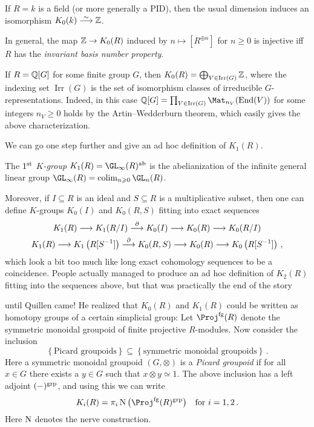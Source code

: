 	\begin{exm}
		\begin{alphanumerate}
			\item If $R=k$ is a field (or more generally a PID), then the usual dimension induces an isomorphism $K_0(k)\isomorphism\IZ$.
			\item In general, the map $\mathbb{Z}\rightarrow K_0(R)$ induced by $n\mapsto [R^{\oplus n}]$ for $n\geq0$ is injective iff $R$ has the \emph{invariant basis number property}.
			\item If $R=\mathbb{Q}[G]$ for some finite group $G$, then $K_0(R)=\bigoplus_{V\in \operatorname{Irr}(G)}\mathbb{Z}$, where the indexing set $\operatorname{Irr}(G)$ is the set of isomorphism classes of irreducible $G$-representations. Indeed, in this case $\IQ[G]=\prod_{V\in\operatorname{Irr}(G)}\Mat_{n_V}(\End(V))$ for some integers $n_V\geq 0$ holds by the Artin--Wedderburn theorem, which easily gives the above characterization.
		\end{alphanumerate}
	\end{exm}
	We can go one step further and give an ad hoc definition of $K_1(R)$.
	\begin{defi}
		The \emph{$1^{\text{st}}$ $K$-group} $K_1(R)=\GL_\infty(R)^\ab$ is the abelianization of the infinite general linear group $\GL_\infty(R)=\colimit_{n\geq 0}\GL_n(R)$.
	\end{defi}
	Moreover, if $I\subseteq R$ is an ideal and $S\subseteq R$ is a multiplicative subset, then one can define $K$-groups $K_0(I)$ and $K_0(R,S)$ fitting into exact sequences
	\begin{gather*}
		K_1(R)\morphism K_1(R/I)\morphism[\partial]K_0(I)\morphism K_0(R)\morphism K_0(R/I)\\
		K_1(R)\morphism K_1\left(R[S^{-1}]\right)\morphism[\partial]K_0(R,S)\morphism K_0(R)\morphism K_0\left(R[S^{-1}]\right)\,,
	\end{gather*}
	which look a bit too much like long exact cohomology sequences to be a coincidence. People actually managed to produce an ad hoc definition of $K_2(R)$ fitting into the sequences above, but that was practically the end of the story \dotso 
	
	\dotso until Quillen came! He realized that $K_0(R)$ and $K_1(R)$ could be written as homotopy groups of a certain simplicial group: Let $\Proj^\fg(R)$ denote the symmetric monoidal groupoid of finite projective $R$-modules. Now consider the inclusion
	\begin{equation*}
		\left\{\text{Picard groupoids}\right\}\subseteq \left\{\text{symmetric monoidal groupoids}\right\}\,.
	\end{equation*}
	Here a symmetric monoidal groupoid $(G,\otimes)$ is a \emph{Picard groupoid} if for all $x\in G$ there exists a $y\in G$ such that $x\otimes y\simeq 1$. The above inclusion has a left adjoint $(-)^{\mathrm{grp}}$, and using this we can write
	\begin{equation*}
		K_i(R)=\pi_i\N\big(\Proj^\fg(R)^\grp\big)\quad\text{for }i=1,2\,.
	\end{equation*}
	Here $\operatorname{N}$ denotes the nerve construction.

